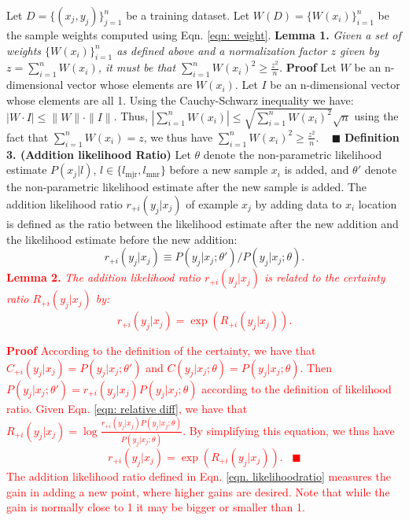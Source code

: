 \documentclass[10pt,journal,compsoc]{IEEEtran}
\begin{document}
Let $D=\{(x_j, y_j)\}_{j=1}^n$ be a training dataset. Let $W(D)=\{W(x_i)\}_{i=1}^n$ be the sample weights computed using Eqn. \ref{eqn: weight}. 
\newline
\newline
\textbf{Lemma 1.} \textit{Given a set of weights $\{W(x_i)\}_{i=1}^n$ as defined above and a normalization factor $z$ given by $z=\sum_{i=1}^n W(x_i)$, it must be that $\sum_{i=1}^n W(x_i)^2 \geq \frac{z^2}{n}$.}
\newline
\newline
\textbf{Proof}
Let $W$ be an n-dimensional vector whose elements are $W(x_i)$. Let $I$ be an n-dimensional vector whose elements are all 1. Using the Cauchy-Schwarz inequality we have: $|W\cdot I|\leq \|W\|\cdot\|I\|$. Thus, $|\sum_{i=1}^n W(x_i)|\leq \sqrt{\sum_{i=1}^n W(x_i)^2 }\sqrt{n}$ using the fact that $\sum_{i=1}^n W(x_i)=z$, we thus have $\sum_{i=1}^n W(x_i)^2 \geq \frac{z^2}{n}$.  $\;\;\;\blacksquare$
\newline
\newline
\noindent\textbf{Definition 3. (Addition likelihood Ratio)} Let $\theta$ denote the non-parametric likelihood estimate $P(x_j|l)$, $l\in \{l_{\mbox{mjr}}, l_{\mbox{mnr}}\}$ before a new sample $x_i$ is added, and $\theta'$ denote the non-parametric likelihood estimate after the new sample is added. The addition likelihood ratio $r_{+i}(y_j|x_j)$ of example $x_j$ by adding data to $x_i$ location is defined as the ratio between the likelihood estimate after the new addition and the likelihood estimate before the new addition: 
\begin{equation}
r_{+i}(y_j|x_j) \equiv P(y_j|x_j ; \theta') / P(y_j|x_j; \theta).
\label{eqn. likelihoodratio}
\end{equation}
\newline
\textcolor{red}{\noindent \textbf{Lemma 2.} \textit{The addition likelihood ratio $r_{+i}(y_j|x_j)$ is related to the certainty ratio $R_{+i}(y_j|x_j)$ by: }
\begin{equation}
r_{+i}(y_j|x_j)=\exp({R_{+i}(y_j|x_j)}).
\end{equation}}

\textcolor{red}{\noindent\textbf{Proof} According to the definition of the certainty, we have that $C_{+i}(y_j|x_j)=P(y_j|x_j; \theta')$ and $C(y_j|x_j; \theta)=P(y_j|x_j; \theta)$. Then $P(y_j|x_j; \theta')=r_{+i}(y_j|x_j) P(y_j|x_j; \theta)$ according to the definition of likelihood ratio. Given Eqn. \ref{eqn: relative diff}, we have that $R_{+i}(y_j | x_j)=\log\frac{r_{+i}(y_j|x_j) P(y_j | x_j; \theta)}{P(y_j |x_j; \theta)}$.  By simplifying this equation, we thus have 
\begin{equation}
r_{+i}(y_j|x_j)=\exp(R_{+i}(y_j|x_j)). \;\;\;\blacksquare
\end{equation}
The addition likelihood ratio defined in Eqn. \ref{eqn. likelihoodratio} measures the gain in adding a new point, where higher gains are desired. Note that while the gain is normally close to 1 it may be bigger or smaller than 1.
\newline}
\end{document}
